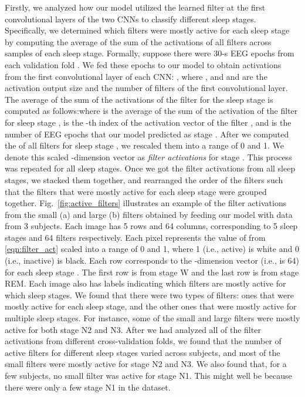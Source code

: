\documentclass[journal,twoside]{IEEEtran}
\begin{document}
Firstly, we analyzed how our model utilized the learned filter at the first convolutional layers of the two CNNs to classify different sleep stages. Specifically, we determined which filters were mostly active for each sleep stage by computing the average of the sum of the activations of all filters across samples of each sleep stage. Formally, suppose there were  30-s EEG epochs from each validation fold . We fed these epochs to our model to obtain activations  from the first convolutional layer of each CNN: , where , and  and  are the activation output size and the number of filters of the first convolutional layer. The average of the sum of the activations of the filter  for the sleep stage  is computed as follows:where  is the average of the sum of the activation of the filter  for sleep stage ,  is the -th index of the activation vector  of the filter , and  is the number of EEG epochs that our model predicted as stage . After we computed the  of all filters for sleep stage , we rescaled them into a range of 0 and 1. We denote this scaled -dimension vector  as \textit{filter activations} for stage . This process was repeated for all sleep stages. Once we got the filter activations from all sleep stages, we stacked them together, and rearranged the order of the filters such that the filters that were mostly active for each sleep stage were grouped together. Fig.~\ref{fig:active_filters} illustrates an example of the filter activations from the small (a) and large (b) filters obtained by feeding our model with data from 3 subjects. Each image has 5 rows and 64 columns, corresponding to 5 sleep stages and 64 filters respectively. Each pixel represents the value of  from \eqref{eqn:filter_act} scaled into a range of 0 and 1, where 1 (i.e., active) is white and 0 (i.e., inactive) is black. Each row corresponds to the -dimension vector (i.e.,  is 64) for each sleep stage . The first row is from stage W and the last row is from stage REM. Each image also has labels indicating which filters are mostly active for which sleep stages. We found that there were two types of filters: ones that were mostly active for each sleep stage, and the other ones that were mostly active for multiple sleep stages. For instance, some of the small and large filters were mostly active for both stage N2 and N3. After we had analyzed all of the filter activations from different cross-validation folds, we found that the number of active filters for different sleep stages varied across subjects, and most of the small filters were mostly active for stage N2 and N3. We also found that, for a few subjects, no small filter was active for stage N1. This might well be because there were only a few stage N1 in the dataset.
\end{document}
